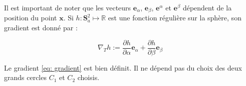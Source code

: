 Il est important de noter que les vecteurs $\mathbf{e}_{\alpha}$, $\mathbf{e}_{\beta}$, $\mathbf{e}^{\alpha}$ et $\mathbf{e}^{\beta}$ dépendent de la position du point $\mathbf{x}$. 
Si $h : \mathbf{S}_a^2 \mapsto \mathbb{R}$ est une fonction régulière sur la sphère, son gradient est donné par :

\begin{equation}
\nabla_{T} h := \dfrac{\partial h}{\partial \alpha} \mathbf{e}_{\alpha} + \dfrac{\partial h}{\partial \beta} \mathbf{e}_{\beta}
\label{eq: gradient}
\end{equation}

\begin{proposition}
Le gradient \eqref{eq: gradient} est bien définit. Il ne dépend pas du choix des deux grands cercles $C_1$ et $C_2$ choisis.
\end{proposition}

